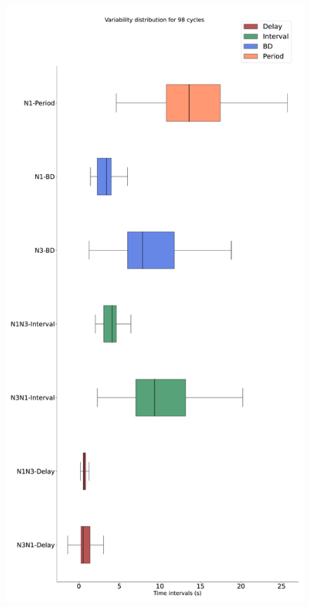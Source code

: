 \begin{figure}[htbp]
\begin{minipage}{0.9\textwidth}
\begin{minipage}[b]{0.45\textwidth}
			\includegraphics[width=\textwidth]{./invariants/data/SUSSEX/prep2/images/spontaneous_2phases_boxplot.pdf}
		\end{minipage}
		\begin{minipage}[b]{0.53\textwidth}

\end{minipage}
\end{minipage}
\end{figure}
